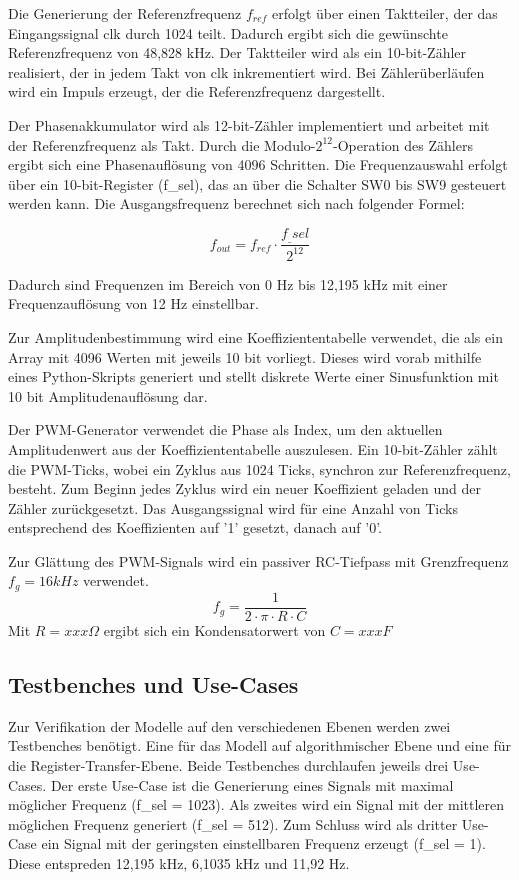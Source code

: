 \noindent Die Generierung der Referenzfrequenz $f_{ref}$ erfolgt über einen Taktteiler, der das Eingangssignal clk durch 1024 teilt.
Dadurch ergibt sich die gewünschte Referenzfrequenz von 48,828 kHz.
Der Taktteiler wird als ein 10-bit-Zähler realisiert, der in jedem Takt von clk inkrementiert wird.
Bei Zählerüberläufen wird ein Impuls erzeugt, der die Referenzfrequenz dargestellt.

\noindent Der Phasenakkumulator wird als 12-bit-Zähler implementiert und arbeitet mit der Referenzfrequenz als Takt.
Durch die Modulo-$2^{12}$-Operation des Zählers ergibt sich eine Phasenauflösung von 4096 Schritten.
Die Frequenzauswahl erfolgt über ein 10-bit-Register (f\_sel), das an über die Schalter SW0 bis SW9 gesteuert werden kann.
Die Ausgangsfrequenz berechnet sich nach folgender Formel:

\begin{equation}
    f_{out} = f_{ref} \cdot \frac{f_\_sel}{2^{12}}
\end{equation}

\noindent Dadurch sind Frequenzen im Bereich von 0 Hz bis 12,195 kHz mit einer Frequenzauflösung von 12 Hz einstellbar. 

\noindent Zur Amplitudenbestimmung wird eine Koeffiziententabelle verwendet, die als ein Array mit 4096 Werten mit jeweils 10 bit vorliegt.
Dieses wird vorab mithilfe eines Python-Skripts generiert und stellt diskrete Werte einer Sinusfunktion mit 10 bit Amplitudenauflösung dar.

\noindent Der PWM-Generator verwendet die Phase als Index, um den aktuellen Amplitudenwert aus der Koeffiziententabelle auszulesen.
Ein 10-bit-Zähler zählt die PWM-Ticks, wobei ein Zyklus aus 1024 Ticks, synchron zur Referenzfrequenz, besteht.
Zum Beginn jedes Zyklus wird ein neuer Koeffizient geladen und der Zähler zurückgesetzt.
Das Ausgangssignal wird für eine Anzahl von Ticks entsprechend des Koeffizienten auf '1' gesetzt, danach auf '0'.

\noindent Zur Glättung des PWM-Signals wird ein passiver RC-Tiefpass mit Grenzfrequenz $f_g = 16 kHz$ verwendet.
\begin{equation}
    f_g=\frac{1}{2 \cdot \pi \cdot R \cdot C}
\end{equation}
Mit $R=xxx \Omega$ ergibt sich ein Kondensatorwert von $C=xxx F$

\subsection{Testbenches und Use-Cases}
Zur Verifikation der Modelle auf den verschiedenen Ebenen werden zwei Testbenches 
benötigt.
Eine für das Modell auf algorithmischer Ebene und eine für die Register-Transfer-Ebene.
Beide Testbenches durchlaufen jeweils drei Use-Cases.
Der erste Use-Case ist die Generierung eines Signals mit maximal möglicher Frequenz (f\_sel = 1023).
Als zweites wird ein Signal mit der mittleren möglichen Frequenz generiert (f\_sel = 512).
Zum Schluss wird als dritter Use-Case ein Signal mit der geringsten einstellbaren Frequenz erzeugt (f\_sel = 1).
Diese entspreden 12,195 kHz, 6,1035 kHz und 11,92 Hz.